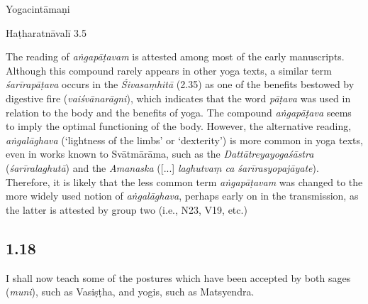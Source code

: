 \begin{ekdosis}
\begin{testimonia}[hp01_017]
Yogacintāmaṇi

\begin{versinnote}
\end{versinnote}

Haṭharatnāvalī 3.5

\begin{versinnote}
\end{versinnote}

\end{testimonia}

\begin{philcomm}[hp01_017]        
The reading of \emph{aṅgapāṭavam} is attested among most of the early manuscripts. Although this compound rarely appears in other yoga texts, a similar term \emph{śarīrapāṭava} occurs in the \emph{Śivasaṃhitā} (2.35) as one of the benefits bestowed by digestive fire (\emph{vaiśvānarāgni}), which indicates that the word \emph{pāṭava} was used in relation to the body and the benefits of yoga. The compound \emph{aṅgapāṭava} seems to imply the optimal functioning of the body. However, the alternative reading, \emph{aṅgalāghava} (‘lightness of the limbs’ or ‘dexterity’) is more common in yoga texts, even in works known to Svātmārāma, such as the \emph{Dattātreyayogaśāstra} (\emph{śarīralaghutā}) and the \textit{Amanaska} ([...] \emph{laghutvaṃ ca śarīrasyopajāyate}). Therefore, it is likely that the less common term \emph{aṅgapāṭavam} was changed to the more widely used notion of \emph{aṅgalāghava}, perhaps early on in the transmission, as the latter is attested by group two (i.e., N23, V19, etc.) 
\end{philcomm}

\subsection*{1.18}
\begin{translation}[hp01_018]
I shall now teach some of the postures which have been accepted by both sages (\emph{muni}), such as Vasiṣṭha, and yogis, such as Matsyendra.
\end{translation}


\end{ekdosis}
